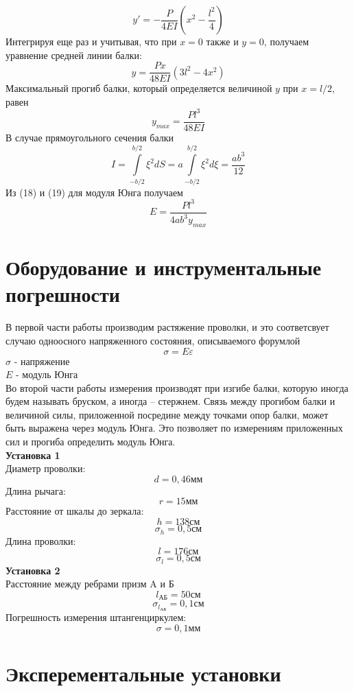 \documentclass[a4paper,12pt]{article} %
\begin{document}
\begin{equation}
y' = - \frac{P}{4EI}\left(x^2-\frac{l^2}{4}\right)
\end{equation}
Интегрируя еще раз и учитывая, что при $x = 0$ также и $y = 0$, получаем уравнение средней линии балки:
\begin{equation}
y = \frac{Px}{48EI}(3l^2-4x^2)
\end{equation}
Максимальный прогиб балки, который определяется величиной $y$ при $x = l/2$, равен
\begin{equation}
y_{max} = \frac{Pl^3}{48EI}
\end{equation}
В случае прямоугольного сечения балки 
\begin{equation}
I = \int\limits_{-b/2}^{b/2}\xi^2 d S = a\int\limits_{-b/2}^{b/2}\xi^2d\xi = \frac{ab^3}{12}
\end{equation}
Из (18) и (19) для модуля Юнга получаем
\begin{equation}
E = \frac{Pl^3}{4ab^3y_{max}}
\end{equation}
\section{Оборудование и инструментальные погрешности}
В первой части работы производим растяжение проволки, и это соответсвует случаю одноосного напряженного состояния, описываемого форумлой 
\[\sigma = E\varepsilon\]
$\sigma$ - напряжение\\
$E$ - модуль Юнга\\
Во второй части работы измерения производят при изгибе балки, которую иногда будем называть бруском, а иногда -- стержнем. Связь между прогибом балки и величиной силы, приложенной посредине между точками опор балки, может быть выражена через модуль Юнга. Это позволяет по измерениям приложенных сил и прогиба определить модуль Юнга.\\
\textbf{Установка 1}\\
Диаметр проволки:
\[d = 0,46\text{мм}\]
Длина рычага:
\[r = 15\text{мм}\]
Расстояние от шкалы до зеркала:
\[h = 138\text{см}\]
\[\sigma_h = 0,5\text{см}\]
Длина проволки:
\[l = 176\text{см}\]
\[\sigma_l = 0,5\text{см}\]
\textbf{Установка 2}\\
Расстояние между ребрами призм A и Б
\[l_\text{АБ} = 50\text{см}\]
\[\sigma_{l_\text{АБ}} = 0,1\text{см}\]
Погрешность измерения штангенциркулем:
\[\sigma = 0,1\text{мм}\]
\section{Эксперементальные установки}
\end{document}
